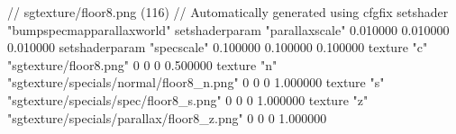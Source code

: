 // sgtexture/floor8.png (116)
// Automatically generated using cfgfix
setshader "bumpspecmapparallaxworld"
setshaderparam "parallaxscale" 0.010000 0.010000 0.010000
setshaderparam "specscale" 0.100000 0.100000 0.100000
texture "c" "sgtexture/floor8.png" 0 0 0 0.500000
texture "n" "sgtexture/specials/normal/floor8_n.png" 0 0 0 1.000000
texture "s" "sgtexture/specials/spec/floor8_s.png" 0 0 0 1.000000
texture "z" "sgtexture/specials/parallax/floor8_z.png" 0 0 0 1.000000
